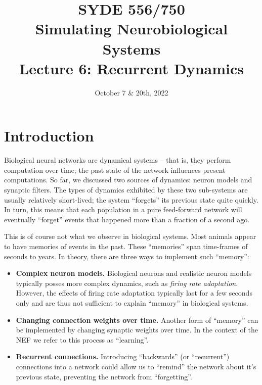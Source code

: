 \documentclass[10pt,letterpaper,oneside]{article}
\date{October 7 \& 20th, 2022}
\title{SYDE 556/750 \\ Simulating Neurobiological Systems \\ Lecture 6: Recurrent Dynamics}
\begin{document}

\section{Introduction}


Biological neural networks are dynamical systems -- that is, they perform computation over time; the past state of the network influences present computations. So far, we discussed two sources of dynamics: neuron models and synaptic filters. The types of dynamics exhibited by these two sub-systems are usually relatively short-lived; the system \enquote{forgets} its previous state quite quickly. In turn, this means that each population in a pure feed-forward network will eventually \enquote{forget} events that happened more than a fraction of a second ago.


This is of course not what we observe in biological systems. Most animals appear to have memories of events in the past. These \enquote{memories} span time-frames of seconds to years. In theory, there are three ways to implement such \enquote{memory}:
\begin{itemize}
	\item \textbf{Complex neuron models.} Biological neurons and realistic neuron models typically posses more complex dynamics, such as \emph{firing rate adaptation}. However, the effects of firing rate adaptation typically last for a few seconds only and are thus not sufficient to explain \enquote{memory} in biological systems.
	\item \textbf{Changing connection weights over time.} Another form of \enquote{memory} can be implemented by changing synaptic weights over time. In the context of the NEF we refer to this process as \enquote{learning}.
	\item \textbf{Recurrent connections.} Introducing \enquote{backwards} (or \enquote{recurrent}) connections into a network could allow us to \enquote{remind} the network about it's previous state, preventing the network from \enquote{forgetting}.
\end{itemize}
\end{document}
